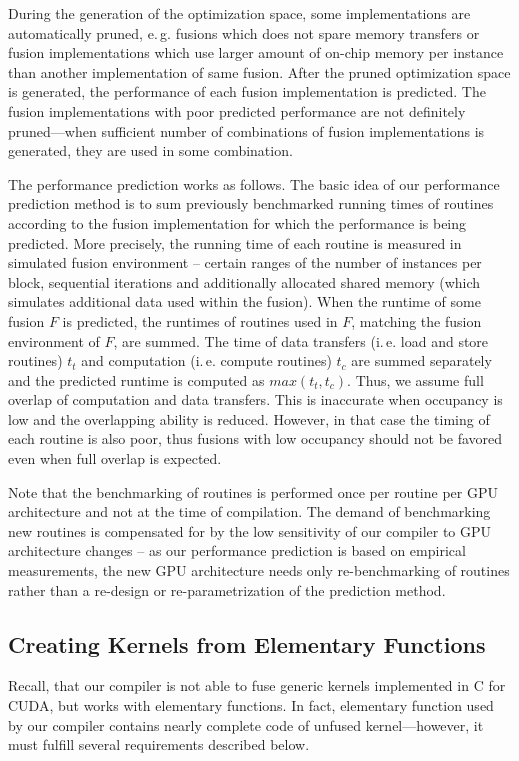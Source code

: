 \documentclass[final]{siamltex}
\def\eg{e.\,g.}
\def\ie{i.\,e.}
\begin{document}
{During the generation of the optimization space, some implementations are automatically pruned, \eg{} fusions which does not spare memory transfers or  fusion implementations which use larger amount of on-chip memory per instance than another implementation of same fusion. After the pruned optimization space is generated, the performance of each fusion implementation is predicted. The fusion implementations with poor predicted performance are not definitely pruned---when sufficient number of combinations of fusion implementations is generated, they are used in some combination.


The performance prediction works as follows. The basic idea of our performance prediction method is to sum previously benchmarked running times of routines according to the fusion implementation for which the performance is being predicted.
More precisely, the running time of each routine is measured in simulated fusion environment -- certain ranges of the number of instances per block, sequential iterations and additionally allocated shared memory (which simulates additional data used within the fusion). When the runtime of some fusion $F$ is predicted, the runtimes of routines used in $F$, matching the fusion environment of $F$, are summed. The time of data transfers (\ie{} load and store routines) $t_t$ and computation (\ie{} compute routines) $t_c$ are summed separately and the predicted runtime is computed as $max(t_t, t_c)$. Thus, we assume full overlap of computation and data transfers. This is inaccurate when occupancy is low and the overlapping ability is reduced. However, in that case the timing of each routine is also poor, thus fusions with low occupancy should not be favored even when full overlap is expected.

Note that the benchmarking of routines is performed once per routine per GPU architecture and not at the time of compilation. The demand of benchmarking new routines is compensated for by the low sensitivity of our compiler to GPU architecture changes -- as our performance prediction is based on empirical measurements, the new GPU architecture needs only re-benchmarking of routines rather than a re-design or re-parametrization of the prediction method.

\subsection{Creating Kernels from Elementary Functions}

Recall, that our compiler is not able to fuse generic kernels implemented in C for CUDA, but works with elementary functions. In fact, elementary function used by our compiler contains nearly complete code of unfused kernel---however, it must fulfill several requirements described below.

}
\end{document}
